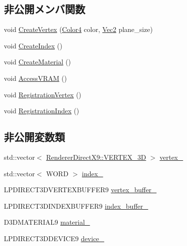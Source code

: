 \subsection*{非公開メンバ関数}
\begin{DoxyCompactItemize}
\item 
void \mbox{\hyperlink{class_plane_polygon_aa002e213c1b0481c8b8ee56caadd270d}{Create\+Vertex}} (\mbox{\hyperlink{_vector3_d_8h_a9c2339f516cf07ce4753b8a99fab3791}{Color4}} color, \mbox{\hyperlink{_vector3_d_8h_a5ef6e95dfc5f9d3820b71772d99bbc25}{Vec2}} plane\+\_\+size)
\item 
void \mbox{\hyperlink{class_plane_polygon_a55840ace8bfa216c37f94e963b3fa5e3}{Create\+Index}} ()
\item 
void \mbox{\hyperlink{class_plane_polygon_a4539899c78a222ddc651e45943a7f55b}{Create\+Material}} ()
\item 
void \mbox{\hyperlink{class_plane_polygon_a88e476aa4b627d7242dc4f1b5eccf889}{Access\+V\+R\+AM}} ()
\item 
void \mbox{\hyperlink{class_plane_polygon_af4ba95cfaf0aba506eeb58cdc80bfd46}{Registration\+Vertex}} ()
\item 
void \mbox{\hyperlink{class_plane_polygon_a535d0222908f4a4a030d8b525b225554}{Registration\+Index}} ()
\end{DoxyCompactItemize}
\subsection*{非公開変数類}
\begin{DoxyCompactItemize}
\item 
std\+::vector$<$ \mbox{\hyperlink{class_renderer_direct_x9_1_1_v_e_r_t_e_x__3_d}{Renderer\+Direct\+X9\+::\+V\+E\+R\+T\+E\+X\+\_\+3D}} $>$ \mbox{\hyperlink{class_plane_polygon_a81a3f3d50f00a8772bc47c1015789e7a}{vertex\+\_\+}}
\item 
std\+::vector$<$ W\+O\+RD $>$ \mbox{\hyperlink{class_plane_polygon_a75b4c7fca8f0b25f11bd59da087b5a07}{index\+\_\+}}
\item 
L\+P\+D\+I\+R\+E\+C\+T3\+D\+V\+E\+R\+T\+E\+X\+B\+U\+F\+F\+E\+R9 \mbox{\hyperlink{class_plane_polygon_a04d132486ffae704f7200718ae395170}{vertex\+\_\+buffer\+\_\+}}
\item 
L\+P\+D\+I\+R\+E\+C\+T3\+D\+I\+N\+D\+E\+X\+B\+U\+F\+F\+E\+R9 \mbox{\hyperlink{class_plane_polygon_adc95fd0cfa590e34aba0f7928539a0ff}{index\+\_\+buffer\+\_\+}}
\item 
D3\+D\+M\+A\+T\+E\+R\+I\+A\+L9 \mbox{\hyperlink{class_plane_polygon_a1427bc1b198247eb0a82485f6d63c23e}{material\+\_\+}}
\item 
L\+P\+D\+I\+R\+E\+C\+T3\+D\+D\+E\+V\+I\+C\+E9 \mbox{\hyperlink{class_plane_polygon_a9b07736e5b36983967d0fac67c39dc82}{device\+\_\+}}
\end{DoxyCompactItemize}
